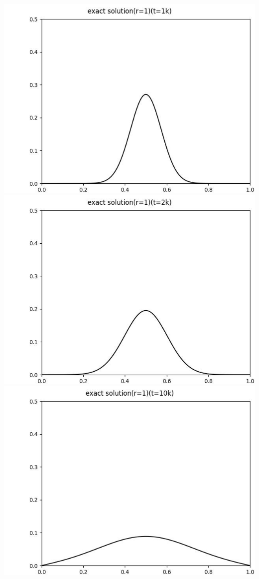 \documentclass[12pt]{ctexart}
\begin{document}
\includegraphics[scale=0.35]{exact solution(r=1)(t=1k).jpg}
\includegraphics[scale=0.35]{exact solution(r=1)(t=2k).jpg}
\includegraphics[scale=0.35]{exact solution(r=1)(t=10k).jpg}
\end{document}
